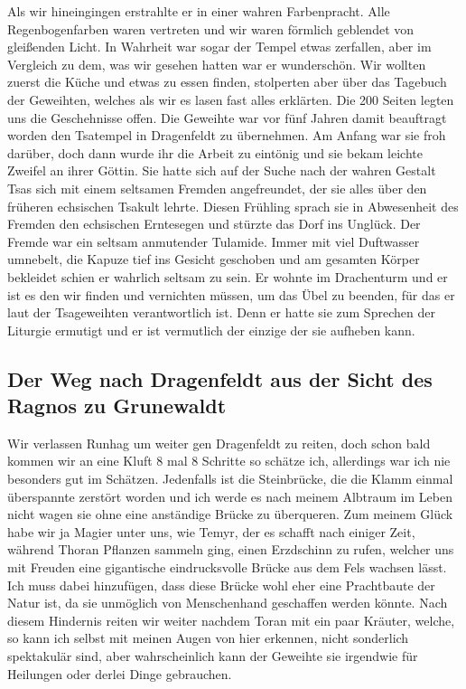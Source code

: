Als wir hineingingen erstrahlte er in einer wahren Farbenpracht. Alle Regenbogenfarben waren vertreten und wir waren förmlich geblendet von gleißenden Licht. In Wahrheit war sogar der Tempel etwas zerfallen, aber im Vergleich zu dem, was wir gesehen hatten war er wunderschön. Wir wollten zuerst die Küche und etwas zu essen finden, stolperten aber über das Tagebuch der Geweihten, welches als wir es lasen fast alles erklärten. Die 200 Seiten legten uns die Geschehnisse offen. Die Geweihte war vor fünf Jahren damit beauftragt worden den Tsatempel in Dragenfeldt  zu übernehmen. Am Anfang war sie froh darüber, doch dann wurde ihr die Arbeit zu eintönig und sie bekam leichte Zweifel an ihrer Göttin. Sie hatte sich auf der Suche nach der wahren Gestalt Tsas sich mit einem seltsamen Fremden angefreundet, der sie alles über den früheren echsischen Tsakult lehrte. Diesen Frühling sprach sie in Abwesenheit des Fremden den echsischen Erntesegen und stürzte das Dorf ins Unglück. Der Fremde war ein seltsam anmutender Tulamide. Immer mit viel Duftwasser umnebelt, die Kapuze tief ins Gesicht geschoben und am gesamten Körper bekleidet schien er wahrlich seltsam zu sein. Er wohnte im Drachenturm und er ist es den wir finden und vernichten müssen, um das Übel zu beenden, für das er laut der Tsageweihten verantwortlich ist. Denn er hatte sie zum Sprechen der Liturgie ermutigt und er ist vermutlich der einzige der sie aufheben kann.

\subsection{Der Weg nach Dragenfeldt aus der Sicht des Ragnos zu Grunewaldt}

Wir verlassen Runhag um weiter gen Dragenfeldt  zu reiten, doch schon bald kommen wir an eine Kluft 8 mal 8 Schritte so schätze ich, allerdings war ich nie besonders gut im Schätzen. Jedenfalls ist die Steinbrücke, die die Klamm einmal überspannte zerstört worden und ich werde es nach meinem Albtraum im Leben nicht wagen sie ohne eine anständige Brücke zu überqueren. Zum meinem Glück habe wir ja Magier unter uns, wie Temyr, der es schafft nach einiger Zeit, während Thoran Pflanzen sammeln ging, einen Erzdschinn zu rufen, welcher uns mit Freuden eine gigantische
eindrucksvolle Brücke aus dem Fels wachsen lässt. Ich muss dabei hinzufügen, dass diese Brücke wohl eher eine Prachtbaute der Natur ist, da sie unmöglich von Menschenhand geschaffen werden könnte. Nach diesem Hindernis reiten wir weiter nachdem Toran mit ein paar Kräuter, welche, so kann ich selbst mit meinen Augen von hier erkennen, nicht sonderlich spektakulär sind, aber wahrscheinlich kann der Geweihte sie irgendwie für Heilungen oder derlei Dinge gebrauchen.

